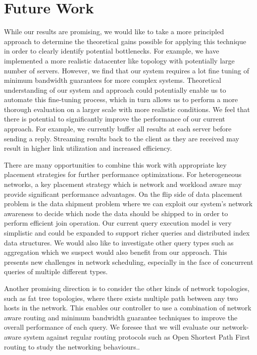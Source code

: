 \documentclass{sig-alternate-2013}
\begin{document}
\section{Future Work}

While our results are promising, we would like to take a more principled
approach to determine the theoretical gains possible for applying this
technique in order to clearly identify potential bottlenecks.  For example, we
have implemented a more realistic datacenter like topology with potentially
large number of servers. However, we find that our system requires a lot fine
tuning of minimum bandwidth guarantees for more complex systems. Theoretical
understanding of our system and approach could potentially enable us to
automate this fine-tuning process, which in turn allows us to perform a more
thorough evaluation on a larger scale with more realistic conditions. We feel
that there is potential to significantly improve the performance of our current
approach.  For example, we currently buffer all results at each server before
sending a reply.  Streaming results back to the client as they are received may
result in higher link utilization and increased efficiency.

There are many opportunities to combine this work with appropriate key
placement strategies for further performance optimizations.  For heterogeneous
networks, a key placement strategy which is network and workload aware may
provide significant performance advantages. On the flip side of data placement
problem is the data shipment problem where we can exploit our system's network
awareness to decide which node the data should be shipped to in order to
perform efficient join operation. Our current query execution model is very
simplistic and could be expanded to support richer queries and distributed
index data structures.  We would also like to investigate other query types
such as aggregation which we suspect would also benefit from our approach.
This presents new challenges in network scheduling, especially in the face of
concurrent queries of multiple different types.

Another promising direction is to consider the other kinds of network
topologies, such as fat tree topologies, where there exists multiple path
between any two hosts in the network. This enables our controller to use a
combination of network aware routing and minimum bandwidth guarantee techniques
to improve the overall performance of each query. We foresee that we will
evaluate our network-aware system against regular routing protocols such as
Open Shortest Path First routing to study the networking behaviours..
\end{document}
